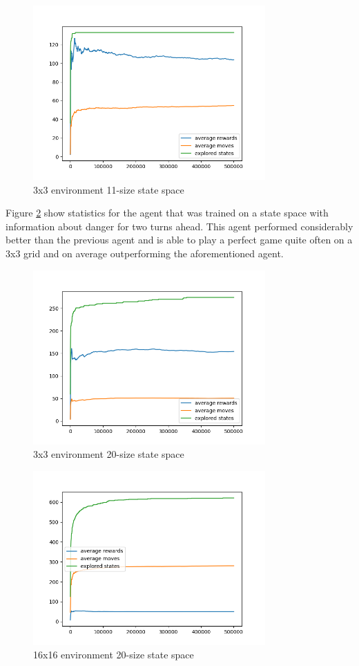 \documentclass[lettersize,journal]{IEEEtran}
\begin{document}
\begin{figure}[!t]
\centering
\includegraphics[width=3.5in]{3_fig.png}
\caption{3x3 environment 11-size state space}
\label{fig1}
\end{figure}

Figure \ref{fig2} show statistics for the agent that was trained on a
state space with information about danger for two turns ahead.
This agent performed considerably better than the previous agent and
is able to play a perfect game quite often on a 3x3 grid and on average outperforming
the aforementioned agent.

\begin{figure}[!t]
\centering
\includegraphics[width=3.5in]{3-depth_fig.png}
\caption{3x3 environment 20-size state space}
\label{fig2}
\end{figure}

\begin{figure}[!t]
\centering
\includegraphics[width=3.5in]{16_fig.png}
\caption{16x16 environment 20-size state space}
\label{fig3}
\end{figure}
\end{document}
